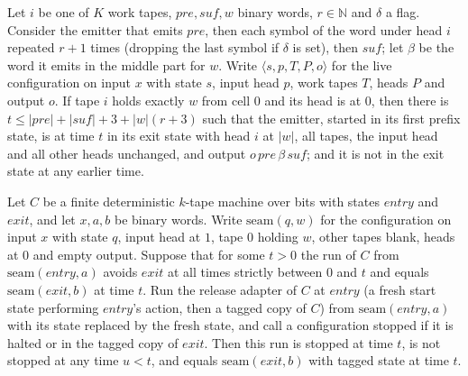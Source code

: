 \begin{theorem}
\label{Turing.NTimeDiag.qy_emit_run}
\leanok
{}
Let $i$ be one of $K$ work tapes, $\mathit{pre}, \mathit{suf}, w$ binary words, $r \in \mathbb{N}$
and $\delta$ a flag. Consider the emitter that emits $\mathit{pre}$, then each symbol of the word
under head $i$ repeated $r + 1$ times (dropping the last symbol if $\delta$ is set), then
$\mathit{suf}$; let $\beta$ be the word it emits in the middle part for $w$. Write
$\langle s, p, T, P, o\rangle$ for the live configuration on input $x$ with state $s$, input head
$p$, work tapes $T$, heads $P$ and output $o$. If tape $i$ holds exactly $w$ from cell $0$ and its
head is at $0$, then there is
$t \le |\mathit{pre}| + |\mathit{suf}| + 3 + |w|(r + 3)$ such that the emitter, started in its
first prefix state, is at time $t$ in its exit state with head $i$ at $|w|$, all tapes, the input
head and all other heads unchanged, and output $o\,\mathit{pre}\,\beta\,\mathit{suf}$; and it is
not in the exit state at any earlier time.
\end{theorem}

\begin{theorem}
\label{Turing.NTimeDiag.qy_release_first_stop}
\leanok
{}
Let $C$ be a finite deterministic $k$-tape machine over bits with states $\mathit{entry}$ and
$\mathit{exit}$, and let $x, a, b$ be binary words. Write $\mathrm{seam}(q, w)$ for the
configuration on input $x$ with state $q$, input head at $1$, tape $0$ holding $w$, other tapes
blank, heads at $0$ and empty output. Suppose that for some $t > 0$ the run of $C$ from
$\mathrm{seam}(\mathit{entry}, a)$ avoids $\mathit{exit}$ at all times strictly between $0$ and
$t$ and equals $\mathrm{seam}(\mathit{exit}, b)$ at time $t$. Run the release adapter of $C$ at
$\mathit{entry}$ (a fresh start state performing $\mathit{entry}$'s action, then a tagged copy
of $C$) from $\mathrm{seam}(\mathit{entry}, a)$ with its state replaced by the fresh state, and
call a configuration stopped if it is halted or in the tagged copy of $\mathit{exit}$. Then this
run is stopped at time $t$, is not stopped at any time $u < t$, and equals
$\mathrm{seam}(\mathit{exit}, b)$ with tagged state at time $t$.
\end{theorem}

